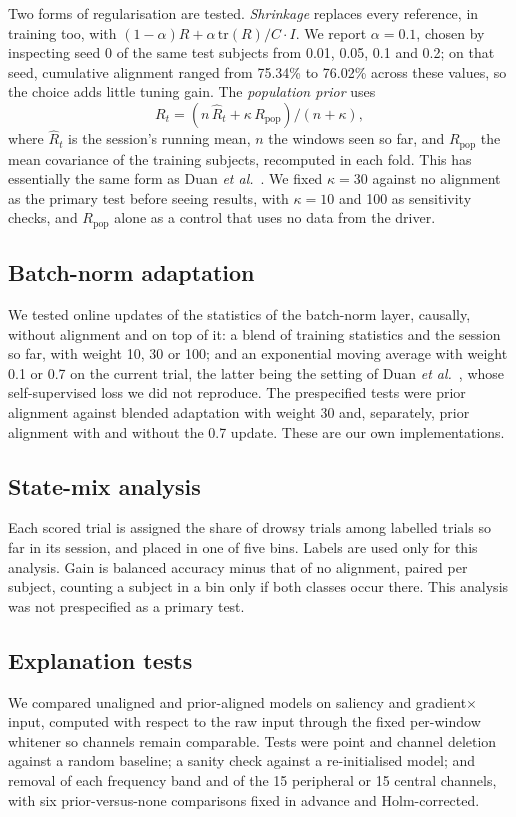 Two forms of regularisation are tested. \textit{Shrinkage} replaces every reference, in training too, with $(1-\alpha)R + \alpha\,\mathrm{tr}(R)/C \cdot I$. We report $\alpha = 0.1$, chosen by inspecting seed 0 of the same test subjects from 0.01, 0.05, 0.1 and 0.2; on that seed, cumulative alignment ranged from 75.34\% to 76.02\% across these values, so the choice adds little tuning gain. The \textit{population prior} uses
\begin{equation}
R_t = (n\,\hat{R}_t + \kappa\,R_{\mathrm{pop}})/(n + \kappa),
\end{equation}
where $\hat{R}_t$ is the session's running mean, $n$ the windows seen so far, and $R_{\mathrm{pop}}$ the mean covariance of the training subjects, recomputed in each fold. This has essentially the same form as Duan \textit{et al.}~\cite{duan2025online}. We fixed $\kappa = 30$ against no alignment as the primary test before seeing results, with $\kappa = 10$ and 100 as sensitivity checks, and $R_{\mathrm{pop}}$ alone as a control that uses no data from the driver.

\subsection{Batch-norm adaptation}
We tested online updates of the statistics of the batch-norm layer, causally, without alignment and on top of it: a blend of training statistics and the session so far, with weight 10, 30 or 100; and an exponential moving average with weight 0.1 or 0.7 on the current trial, the latter being the setting of Duan \textit{et al.}~\cite{duan2025online}, whose self-supervised loss we did not reproduce. The prespecified tests were prior alignment against blended adaptation with weight 30 and, separately, prior alignment with and without the 0.7 update. These are our own implementations.

\subsection{State-mix analysis}
Each scored trial is assigned the share of drowsy trials among labelled trials so far in its session, and placed in one of five bins. Labels are used only for this analysis. Gain is balanced accuracy minus that of no alignment, paired per subject, counting a subject in a bin only if both classes occur there. This analysis was not prespecified as a primary test.

\subsection{Explanation tests}
We compared unaligned and prior-aligned models on saliency and gradient$\times$input, computed with respect to the raw input through the fixed per-window whitener so channels remain comparable. Tests were point and channel deletion against a random baseline; a sanity check \cite{adebayo2018sanity} against a re-initialised model; and removal of each frequency band and of the 15 peripheral or 15 central channels, with six prior-versus-none comparisons fixed in advance and Holm-corrected.
